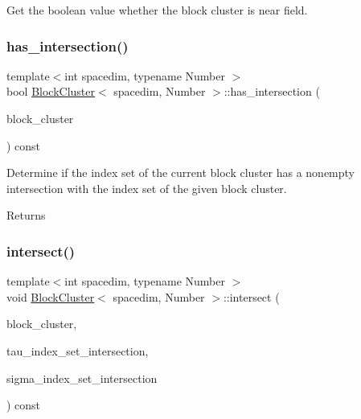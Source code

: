 Get the boolean value whether the block cluster is near field. \mbox{\label{classBlockCluster_adf556b6483f3a81a39d3625c15e9787d}} 
\subsubsection{\texorpdfstring{has\+\_\+intersection()}{has\_intersection()}}
{\footnotesize\ttfamily template$<$int spacedim, typename Number $>$ \\
bool \hyperlink{classBlockCluster}{Block\+Cluster}$<$ spacedim, Number $>$\+::has\+\_\+intersection (\begin{DoxyParamCaption}\item[{const \hyperlink{classBlockCluster}{Block\+Cluster}$<$ spacedim, Number $>$ \&}]{block\+\_\+cluster }\end{DoxyParamCaption}) const}

Determine if the index set of the current block cluster has a nonempty intersection with the index set of the given block cluster. \begin{DoxyReturn}{Returns}

\end{DoxyReturn}
\mbox{\label{classBlockCluster_a361efceed1f584db66a518007b5af633}} 
\subsubsection{\texorpdfstring{intersect()}{intersect()}}
{\footnotesize\ttfamily template$<$int spacedim, typename Number $>$ \\
void \hyperlink{classBlockCluster}{Block\+Cluster}$<$ spacedim, Number $>$\+::intersect (\begin{DoxyParamCaption}\item[{const \hyperlink{classBlockCluster}{Block\+Cluster}$<$ spacedim, Number $>$ \&}]{block\+\_\+cluster,  }\item[{std\+::vector$<$ types\+::global\+\_\+dof\+\_\+index $>$ \&}]{tau\+\_\+index\+\_\+set\+\_\+intersection,  }\item[{std\+::vector$<$ types\+::global\+\_\+dof\+\_\+index $>$ \&}]{sigma\+\_\+index\+\_\+set\+\_\+intersection }\end{DoxyParamCaption}) const}

